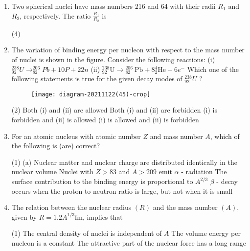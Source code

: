 \begin{enumerate}
	\item Two spherical nuclei have mass numbers 216 and 64 with their radii $R_{1}$ and $R_{2}$, respectively. The ratio $\frac{R_{1}}{R_{2}}$ is
	{	}
	\begin{tasks}(4)
	\end{tasks}
	\item The variation of binding energy per nucleon with respect to the mass number of nuclei is shown in the figure.
	Consider the following reactions:
	(i) ${ }_{92}^{238} U \rightarrow_{82}^{206} P b+10 P+22 n$
	(ii) ${ }_{92}^{238} \mathrm{U} \rightarrow{ }_{82}^{206} \mathrm{~Pb}+8{ }_{2}^{4} \mathrm{He}+6 e^{-}$
	Which one of the following statements is true for the given decay modes of ${ }_{92}^{238} U$ ?
	{}
	\begin{figure}[H]
		\centering
		\texttt{[image: diagram-20211122(45)-crop]}
	\end{figure}
	\begin{tasks}(2)
		\task[\textbf{A.}]Both (i) and (ii) are allowed
		\task[\textbf{B.}]Both (i) and (ii) are forbidden
		\task[\textbf{C.}](i) is forbidden and (ii) is allowed
		\task[\textbf{D.}](i) is allowed and (ii) is forbidden
	\end{tasks}
	\item For an atomic nucleus with atomic number $Z$ and mass number $A$, which of the following is (are) correct?
	{	}
	\begin{tasks}(1)
		\task[\textbf{A.}](a) Nuclear matter and nuclear charge are distributed identically in the nuclear volume
		\task[\textbf{B.}]Nuclei with $Z>83$ and $A>209$ emit $\alpha$ - radiation
		\task[\textbf{C.}] The surface contribution to the binding energy is proportional to $A^{2 / 3}$
		\task[\textbf{D.}]$\beta$ - decay occurs when the proton to neutron ratio is large, but not when it is small
	\end{tasks}
	\item The relation between the nuclear radius $(R)$ and the mass number $(A)$, given by $R=1.2 A^{1 / 3} \mathrm{fm}$, implies that
	{	}
	\begin{tasks}(1)
		\task[\textbf{A.}]The central density of nuclei is independent of $A$
		\task[\textbf{B.}]The volume energy per nucleon is a constant
		\task[\textbf{C.}]The attractive part of the nuclear force has a long range

\end{tasks}
\end{enumerate}

